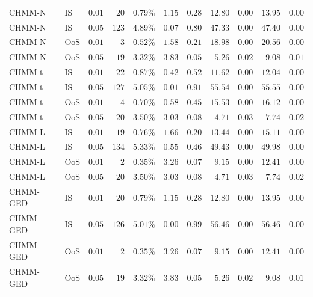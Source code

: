 \begin{table}[!ht]
\begin{tabular}{l l c r r r r r r r r}
\midrule
CHMM-N & IS  & $0.01$ & $20$  & $0.79\%$ & $1.15$ & $0.28$ & $12.80$ & $0.00$ & $13.95$ & $0.00$ \\
CHMM-N & IS  & $0.05$ & $123$ & $4.89\%$ & $0.07$ & $0.80$ & $47.33$ & $0.00$ & $47.40$ & $0.00$ \\
CHMM-N & OoS & $0.01$ & $3$   & $0.52\%$ & $1.58$ & $0.21$ & $18.98$ & $0.00$ & $20.56$ & $0.00$ \\
CHMM-N & OoS & $0.05$ & $19$  & $3.32\%$ & $3.83$ & $0.05$ & $5.26$  & $0.02$ & $9.08$  & $0.01$ \\
\midrule
CHMM-t & IS  & $0.01$ & $22$  & $0.87\%$ & $0.42$ & $0.52$ & $11.62$ & $0.00$ & $12.04$ & $0.00$ \\
CHMM-t & IS  & $0.05$ & $127$ & $5.05\%$ & $0.01$ & $0.91$ & $55.54$ & $0.00$ & $55.55$ & $0.00$ \\
CHMM-t & OoS & $0.01$ & $4$   & $0.70\%$ & $0.58$ & $0.45$ & $15.53$ & $0.00$ & $16.12$ & $0.00$ \\
CHMM-t & OoS & $0.05$ & $20$  & $3.50\%$ & $3.03$ & $0.08$ & $4.71$  & $0.03$ & $7.74$  & $0.02$ \\
\midrule
CHMM-L & IS  & $0.01$ & $19$  & $0.76\%$ & $1.66$ & $0.20$ & $13.44$ & $0.00$ & $15.11$ & $0.00$ \\
CHMM-L & IS  & $0.05$ & $134$ & $5.33\%$ & $0.55$ & $0.46$ & $49.43$ & $0.00$ & $49.98$ & $0.00$ \\
CHMM-L & OoS & $0.01$ & $2$   & $0.35\%$ & $3.26$ & $0.07$ & $9.15$  & $0.00$ & $12.41$ & $0.00$ \\
CHMM-L & OoS & $0.05$ & $20$  & $3.50\%$ & $3.03$ & $0.08$ & $4.71$  & $0.03$ & $7.74$  & $0.02$ \\
\midrule
CHMM-GED & IS  & $0.01$ & $20$  & $0.79\%$ & $1.15$ & $0.28$ & $12.80$ & $0.00$ & $13.95$ & $0.00$ \\
CHMM-GED & IS  & $0.05$ & $126$ & $5.01\%$ & $0.00$ & $0.99$ & $56.46$ & $0.00$ & $56.46$ & $0.00$ \\
CHMM-GED & OoS & $0.01$ & $2$   & $0.35\%$ & $3.26$ & $0.07$ & $9.15$  & $0.00$ & $12.41$ & $0.00$ \\
CHMM-GED & OoS & $0.05$ & $19$  & $3.32\%$ & $3.83$ & $0.05$ & $5.26$  & $0.02$ & $9.08$  & $0.01$ \\
\bottomrule
\end{tabular}
\end{table}

